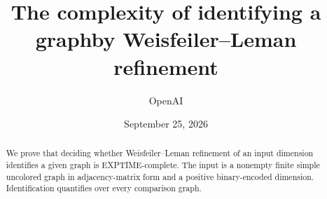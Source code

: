 \documentclass[11pt]{article}
\title{The complexity of identifying a graph\newline by Weisfeiler--Leman refinement}
\author{OpenAI}
\date{September 25, 2026}
\theoremstyle{definition}
\theoremstyle{remark}
\numberwithin{equation}{section}
\begin{document}
\maketitle
\begin{abstract}
We prove that deciding whether Weisfeiler--Leman refinement of an input
dimension identifies a given graph is EXPTIME-complete. The input is a
nonempty finite simple uncolored graph in adjacency-matrix form and a
positive binary-encoded dimension. Identification quantifies over every
comparison graph.
\end{abstract}
\setcounter{tocdepth}{1}
\tableofcontents
\clearpage







\begingroup
\raggedright

\endgroup
\end{document}
